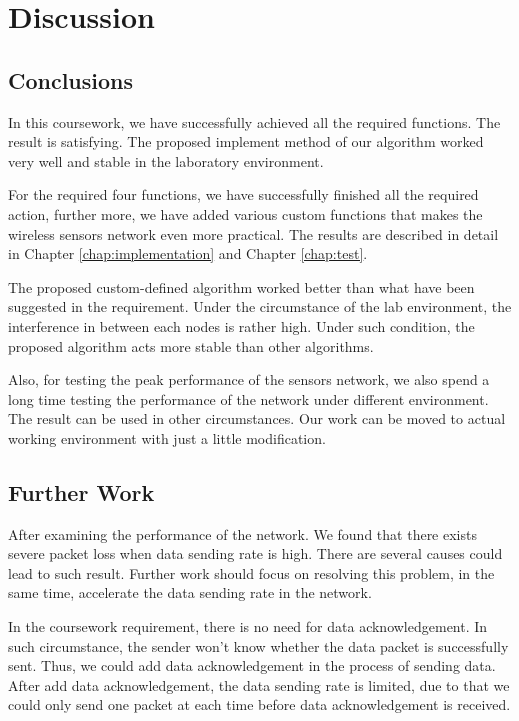 \chapter{Discussion}
\label{chap:discussion}


\section{Conclusions}
In this coursework, we have successfully achieved all the required functions. The result is satisfying. The proposed implement method of our algorithm worked very well and stable in the laboratory environment.

For the required four functions, we have successfully finished all the required action, further more, we have added various custom functions that makes the wireless sensors network even more practical. The results are described in detail in Chapter \ref{chap:implementation} and Chapter \ref{chap:test}.

The proposed custom-defined algorithm worked better than what have been suggested in the requirement. Under the circumstance of the lab environment, the interference in between each nodes is rather high. Under such condition, the proposed algorithm acts more stable than other algorithms.

Also, for testing the peak performance of the sensors network, we also spend a long time testing the performance of the network under different environment. The result can be used in other circumstances. Our work can be moved to actual working environment with just a little modification.

\section{Further Work}


After examining the performance of the network. We found that there exists severe packet loss when data sending rate is high. There are several causes could lead to such result. Further work should focus on resolving this problem, in the same time, accelerate the data sending rate in the network.

In the coursework requirement, there is no need for data acknowledgement. In such circumstance, the sender won’t know whether the data packet is successfully sent. Thus, we could add data acknowledgement in the process of sending data. After add data acknowledgement, the data sending rate is limited, due to that we could only send one packet at each time before data acknowledgement is received.

